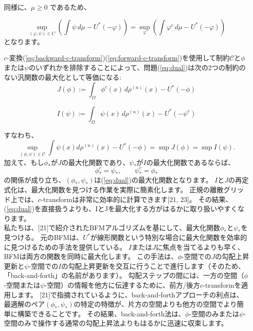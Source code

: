 \documentclass{jsarticle}
\theoremstyle{definition}
\begin{document}
同様に、\(\mu \geq 0\) であるため、

\begin{equation}
  \label{eq:phi^c}
  \sup_{(\varphi, \psi) \in C} \left(\int \psi \, d\mu - U^*(- \varphi)\right) = \sup_\varphi \left(\int \varphi^c \, d\mu - U^*(- \varphi)\right)
\end{equation}
となります。\\

\vspace\baselineskip 

$c$-変換(\ref{eq:backward-c-transform})(\ref{eq:forward-c-transform})を使用して制約$\mathcal{C}$と$\phi$または$\psi$のいずれかを排除することによって、問題(\ref{eq:dual})は次の2つの制約のない汎関数の最大化として等価になる:
\begin{equation}
    \label{eq:J}
    J(\phi):= \int_{\Omega} \phi^c(x) \,d\rho^{(n)}(x) - U^*(- \phi)
\end{equation}

\begin{equation}
    \label{eq:I}
    I(\psi):= \int_{\Omega} \psi(x) \, d\rho^{(n)}(x) - U^*(- \psi^{c})
\end{equation}

すなわち、
$$
\sup_{(\phi,\psi) \in \mathcal{C}} \int \psi(x) d\rho^{(n)}(x) - U^*(- \phi) = \sup J(\phi) = \sup I(\psi).
$$
加えて、もし$\phi_*$が$J$の最大化関数であり、$\psi_*$が$I$の最大化関数であるならば、
$$
    \phi_*^c = \psi_*, \qquad \psi_*^c = \phi_*
$$
の関係が成り立ち、$(\phi_*, \psi_*)$は(\ref{eq:dual})の最大化関数となります。
$I$と$J$の再定式化は、最大化関数を見つける作業を実際に簡素化します。
正規の離散グリッド上では、$c$-transformは非常に効率的に計算できます[21, 23]。
その結果、(\ref{eq:dual})を直接扱うよりも、IとJを最大化する方がはるかに取り扱いやすくなります。\\


私たちは、[21]で紹介されたBFMアルゴリズムを基にして、最大化関数$\phi_*$と$\psi_*$を見つける。
元のBFMは、$U^*$が線形関数という特別な場合に最大化関数を効率的に見つけるための手法を提供している。
$I$または$J$に焦点を当てるよりも早く、BFMは両方の関数を同時に最大化します。
この手法は、$\phi$-空間での$J$の勾配上昇更新と$\psi$-空間での$I$の勾配上昇更新を交互に行うことで進行します（そのため、「back-and-forth」の名前があります）。
勾配ステップの間には、一方の空間（$\phi$-空間または$\psi$-空間）の情報を他方に伝達するために、前方/後方$c$-transformを適用します。
[21]で指摘されているように、back-and-forthアプローチの利点は、最適解のペア$(\phi_*, \psi_*)$の特定の特徴が、片方の空間よりも他方の空間でより簡単に構築できることです。
その結果、back-and-forth法は、$\phi$-空間のみまたは$\psi$-空間のみで操作する通常の勾配上昇法よりもはるかに迅速に収束します。\\
\end{document}
